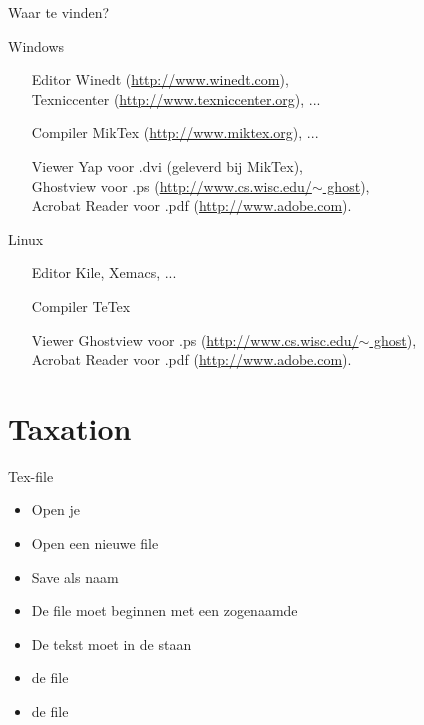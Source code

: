 \documentclass{beamer}
\begin{document}
\begin{frame}{Waar te vinden?}
\pause
\begin{block}{}
\begin{center}
Windows
\end{center}
\end{block}
\pause
\begin{itemize}
\item[Editor] Winedt
(\href{http://www.winedt.com}{http://www.winedt.com}),\\
Texniccenter
(\href{http://www.texniccenter.org}{http://www.texniccenter.org}),
...
\item[Compiler] MikTex (\href{http://www.miktex.org}{http://www.miktex.org}), ...
\item[Viewer] Yap voor .dvi (geleverd bij MikTex),\\
 Ghostview  voor .ps
 (\href{http://www.cs.wisc.edu/~ghost}{http://www.cs.wisc.edu/$\sim$ ghost}),\\
  Acrobat Reader voor .pdf (\href{http://www.adobe.com}{http://www.adobe.com}).
\end{itemize}
\pause
\begin{block}{}
\begin{center}
Linux
\end{center}
\end{block}
\pause

\begin{itemize}
\item[Editor] Kile, Xemacs, ...
\item[Compiler] TeTex
\item[Viewer] Ghostview  voor .ps
 (\href{http://www.cs.wisc.edu/~ghost}{http://www.cs.wisc.edu/$\sim$ ghost}),\\
  Acrobat Reader voor .pdf (\href{http://www.adobe.com}{http://www.adobe.com}).
\end{itemize}
\end{frame}

\section{Taxation}

\begin{frame}{Tex-file}
 \pause
\begin{itemize}
\item Open je  \pause
\item Open een nieuwe file  \pause
\item Save als naam  \pause
\item De file moet beginnen met een zogenaamde
 \pause
\item De tekst moet in de  staan  \pause
\item {} de file  \pause
\item {} de file
\end{itemize}

\end{frame}
\end{document}
